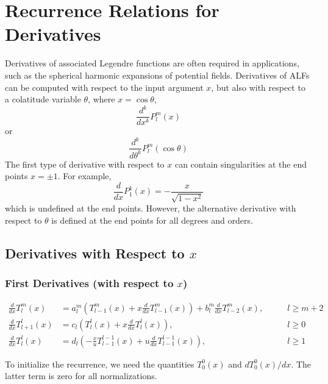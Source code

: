 \documentclass[12pt]{article}
\begin{document}
\section{Recurrence Relations for Derivatives}

Derivatives of associated Legendre functions are often required in
applications, such as the spherical harmonic expansions of potential fields.
Derivatives of ALFs can be computed with respect to the input argument
$x$, but also with respect to a colatitude variable $\theta$, where
$x = \cos{\theta}$,
\begin{equation}
\frac{d^k}{dx^k} P_l^m(x)
\end{equation}
or
\begin{equation}
\frac{d^k}{d\theta^k} P_l^m(\cos{\theta})
\end{equation}
The first type of derivative with respect to $x$ can contain singularities
at the end points $x = \pm 1$. For example,
\begin{equation}
\frac{d}{dx} P_1^1(x) = -\frac{x}{\sqrt{1-x^2}}
\end{equation}
which is undefined at the end points. However, the alternative derivative with
respect to $\theta$ is defined at the end points for all degrees and orders.

\subsection{Derivatives with Respect to $x$}

\subsubsection{First Derivatives (with respect to $x$)}

\begin{subequations}
\begin{alignat}{3}
\frac{d}{dx} T_l^m(x) &= a_l^m \left( T_{l-1}^m(x) + x \frac{d}{dx} T_{l-1}^m(x) \right) + b_l^m \frac{d}{dx} T_{l-2}^m(x), & \qquad l \geq m + 2 \\
\frac{d}{dx} T_{l+1}^l(x) &= c_l \left( T_l^l(x) + x \frac{d}{dx} T_l^l(x) \right), & \qquad l \geq 0 \\
\frac{d}{dx} T_l^l(x) &= d_l \left( -\frac{x}{u} T_{l-1}^{l-1}(x) + u \frac{d}{dx} T_{l-1}^{l-1}(x) \right), & \qquad l \geq 1
\end{alignat}
\end{subequations}

To initialize the recurrence, we need the quantities $T_0^0(x)$ and $d T_0^0(x) / dx$. The latter
term is zero for all normalizations.
\end{document}
